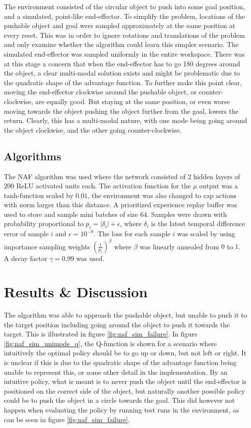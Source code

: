 The environment consisted of the circular object to push into some goal
position, and a simulated, point-like end-effector. To simplify the problem,
locations of the pushable object and goal were sampled approximately at the
same position at every reset. This was in order to ignore rotations and
translations of the problem and only examine whether the algorithm could learn
this simpler scenario. The simulated end-effector was sampled uniformly in the
entire workspace. There was at this stage a concern that when the end-effector
has to go 180 degrees around the object, a clear multi-modal solution exists
and might be problematic due to the quadratic shape of the advantage function.
To further make this point clear, moving the end-effector clockwise around the
pushable object, or counter-clockwise, are equally good.  But staying at the
same position, or even worse moving towards the object pushing the object
further from the goal, lowers the return. Clearly, this has a multi-modal
nature, with one mode being going around the object clockwise, and the other
going counter-clockwise. 

\subsection{Algorithms}

The NAF algorithm was used where the network consisted of 2 hidden layers of
200 ReLU activated units each. The activation function for the $\mu$ output was
a tanh-function scaled by $0.01$, the environment was also changed to cap
actions with norm larger than this distance. A prioritized experience replay
buffer was used to store and sample mini batches of size $64$. Samples were
drawn with probability proportional to $p_i = |\delta_i| + \epsilon$, where
$\delta_i$ is the latest temporal difference error of sample $i$ and $\epsilon
= 10^{-9}$.  The loss for each sample $i$ was scaled by using importance
sampling weights $\left( \frac{1}{p_i}\right) ^\beta$ where $\beta$ was
linearly annealed from $0$ to $1$. A decay factor $\gamma = 0.99$ was used.

\section{Results \& Discussion}

The algorithm was able to approach the pushable object, but unable to push it
to the target position including going around the object to push it towards the
target. This is illustrated in figure \ref{fig:naf_sim_failure}. In figure
\ref{fig:naf_sim_unimode_q}, the Q-function is shown for a scenario where
intuitively the optimal policy should be to go up or down, but not left or
right. It is unclear if this is due to the quadratic shape of the advantage
function being unable to represent this, or some other detail in the
implementation. By an intuitive policy, what is meant is to never push the
object until the end-effector is positioned on the correct side of the object,
but naturally another possible policy could be to push the object in a circle
towards the goal. This did however not happen when evaluating the policy by
running test runs in the environment, as can be seen in figure
\ref{fig:naf_sim_failure}.

